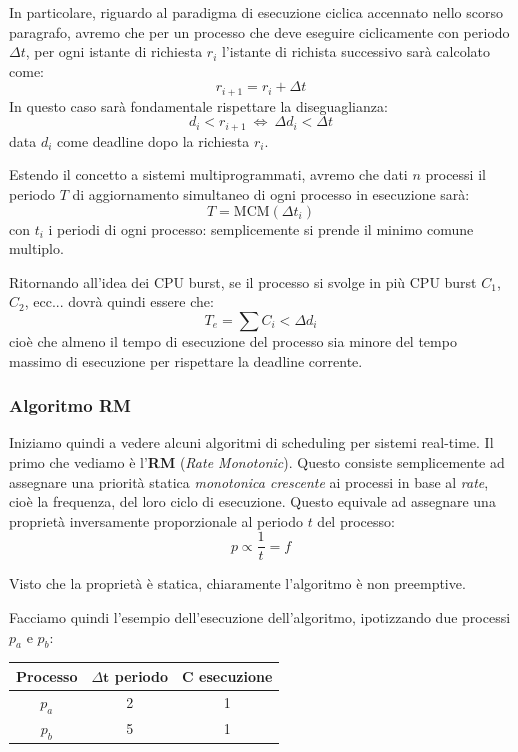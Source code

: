 \documentclass[a4paper,11pt]{article}
\begin{document}
In particolare, riguardo al paradigma di esecuzione ciclica accennato nello scorso paragrafo, avremo che per un processo che deve eseguire ciclicamente con periodo $\Delta t$, per ogni istante di richiesta $r_i$ l'istante di richista successivo sarà calcolato come:
$$
r_{i + 1} = r_i + \Delta t
$$
In questo caso sarà fondamentale rispettare la diseguaglianza:
$$
d_i < r_{i + 1} \ \Leftrightarrow \ \Delta d_i < \Delta t
$$
data $d_i$ come deadline dopo la richiesta $r_i$.

Estendo il concetto a sistemi multiprogrammati, avremo che dati $n$ processi il periodo $T$ di aggiornamento simultaneo di ogni processo in esecuzione sarà:
$$
T = \text{MCM}\left(\Delta t_i\right)
$$
con $t_i$ i periodi di ogni processo: semplicemente si prende il minimo comune multiplo.

\par\smallskip

Ritornando all'idea dei CPU burst, se il processo si svolge in più CPU burst $C_1$, $C_2$, ecc... dovrà quindi essere che:
$$
T_e = \sum C_i < \Delta d_i
$$
cioè che almeno il tempo di esecuzione del processo sia minore del tempo massimo di esecuzione per rispettare la deadline corrente.

\subsubsection{Algoritmo RM}
Iniziamo quindi a vedere alcuni algoritmi di scheduling per sistemi real-time.
Il primo che vediamo è l'\textbf{RM} (\textit{Rate Monotonic}).
Questo consiste semplicemente ad assegnare una priorità statica \textit{monotonica crescente} ai processi in base al \textit{rate}, cioè la frequenza, del loro ciclo di esecuzione.
Questo equivale ad assegnare una proprietà inversamente proporzionale al periodo $t$ del processo:
$$
p \propto \frac{1}{t} = f
$$

Visto che la proprietà è statica, chiaramente l'algoritmo è non preemptive.

\par\smallskip

Facciamo quindi l'esempio dell'esecuzione dell'algoritmo, ipotizzando due processi $p_a$ e $p_b$:
\begin{table}[H]
	\center {}
	\begin{tabular} { c || c | c }
		\bfseries Processo & \bfseries $\Delta \mathbf{t}$ periodo & \bfseries $\mathbf{C}$ esecuzione \\
		\hline
		$p_a$ & 2 & 1 \\ 
		$p_b$ & 5 & 1
	\end{tabular}
\end{table}
\end{document}
